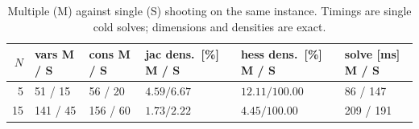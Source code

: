 \begin{table}[htbp]
  \centering
  \small
  \caption{Multiple (M) against single (S) shooting on the same instance. Timings are single cold solves; dimensions and densities are exact.}
  \label{res:tab:shoot}
  \begin{tabular}{rlllll}
    \toprule
    $N$ & vars M / S & cons M / S & jac dens.\ [\%] M / S & hess dens.\ [\%] M / S & solve [ms] M / S \\
    \midrule
    5 & 51 / 15 & 56 / 20 & $4.59 / 6.67$ & $12.11 / 100.00$ & 86 / 147 \\
    15 & 141 / 45 & 156 / 60 & $1.73 / 2.22$ & $4.45 / 100.00$ & 209 / 191 \\
    \bottomrule
  \end{tabular}
\end{table}

